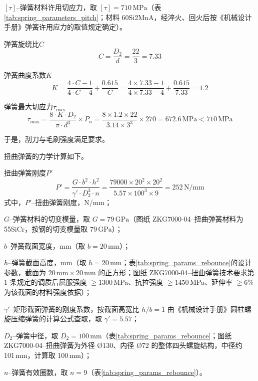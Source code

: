$[\tau]$--弹簧材料许用切应力，取 $[\tau]=710\,\text{MPa}$（表\ref{tab:spring_parameters_pitch}；材料 60Si2MnA，经淬火、回火后按《机械设计手册》弹簧许用应力的取值规定确定）。

弹簧旋绕比$C$
\begin{equation}
    C = \frac{D_2}{d} = \frac{22}{3} = 7.33
\end{equation}

弹簧曲度系数$K$
\begin{equation}
    K = \frac{4 \cdot C - 1}{4 \cdot C - 4} + \frac{0.615}{C} = \frac{4 \times 7.33 - 1}{4 \times 7.33 - 4} + \frac{0.615}{7.33} = 1.2
\end{equation}

弹簧最大切应力$\tau_{\max}$
\begin{equation}
    \tau_{\max} = \frac{8 \cdot K \cdot D_2}{\pi \cdot d^3} \times P_n = \frac{8 \times 1.2 \times 22}{3.14 \times 3^3} \times 270 = 672.6 \, \text{MPa} < 710 \, \text{MPa}
\end{equation}

于是，刮刀与毛刷强度满足要求。

扭曲弹簧的力学计算如下。

扭曲弹簧刚度$P'$
\begin{equation}
    P' = \frac{G \cdot b^2 \cdot h^2}{\gamma' \cdot D_2^3 \cdot n} = \frac{79000 \times 20^2 \times 20^2}{5.57 \times 100^3 \times 9} = 252 \, \text{N/mm}
\end{equation}
式中，$P'$--扭曲弹簧刚度，N/mm；

$G$--弹簧材料的切变模量，取 $G=79\,\text{GPa}$（图纸 ZKG7000-04--扭曲弹簧材料为 55SiCr，按钢的切变模量取 $79\,\text{GPa}$）；

$b$--弹簧截面宽度，mm（取 $b=20$\,mm）；

$h$--弹簧截面高度，mm（取 $h=20$\,mm；表\ref{tab:spring_params_rebounce}的设计参数，截面为 $20\,\text{mm}\times20\,\text{mm}$ 的正方形；图纸 ZKG7000-04--扭曲弹簧技术要求第 1 条规定的调质后屈服强度 $\ge 1300$\,MPa、抗拉强度 $\ge 1450$\,MPa、延伸率 $\ge 6\%$ 为该截面的材料强度依据）；

$\gamma'$--矩形截面弹簧的刚度系数，按截面高宽比 $h/b=1$ 由《机械设计手册》圆柱螺旋压缩弹簧的计算公式\cite{ref26}查取，取 $\gamma'=5.57$；

$D_2$--弹簧中径，取 $D_2=100\,\text{mm}$（表\ref{tab:spring_params_rebounce}；图纸 ZKG7000-04--扭曲弹簧为外径 Ø130、内径 Ø72 的整体四头螺旋结构，中径约 101\,mm，计算取 100\,mm）；

$n$--弹簧有效圈数，取 $n=9$（表\ref{tab:spring_params_rebounce}）。

